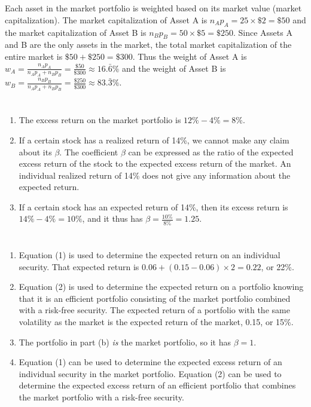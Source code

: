 \documentclass[12pt]{article}
\begin{document}
\section{}
Each asset in the market portfolio is weighted based on its market value (market capitalization). The market capitalization of Asset A is $n_Ap_A=25\times\$2=\$50$ and the market capitalization of Asset B is $n_Bp_B=50\times\$5=\$250$. Since Assets A and B are the only assets in the market, the total market capitalization of the entire market is $\$50+\$250=\$300$. Thus the weight of Asset A is $w_A=\frac{n_Ap_A}{n_Ap_A+n_Bp_B}=\frac{\$50}{\$300}\approx 16.\bar{6}\%$ and the weight of Asset B is $w_B=\frac{n_Bp_B}{n_Ap_A+n_Bp_B}=\frac{\$250}{\$300}\approx 83.\bar{3}\%$.
\section{}
\begin{enumerate}
    \item The excess return on the market portfolio is $12\%-4\%=8\%$. 
    \item If a certain stock has a realized return of 14\%, we cannot make any claim about its $\beta$. The coefficient $\beta$ can be expressed as the ratio of the expected excess return of the stock to the expected excess return of the market. An individual realized return of 14\% does not give any information about the expected return. 
    \item If a certain stock has an expected return of 14\%, then its excess return is $14\%-4\%=10\%$, and it thus has $\beta=\frac{10\%}{8\%}=1.25$.
\end{enumerate}
\section{}
\begin{enumerate}
    \item Equation (1) is used to determine the expected return on an individual security. That expected return is $0.06+(0.15-0.06)\times 2=0.22$, or 22\%.
    \item Equation (2) is used to determine the expected return on a portfolio knowing that it is an efficient portfolio consisting of the market portfolio combined with a risk-free security. The expected return of a portfolio with the same volatility as the market is the expected return of the market, 0.15, or 15\%.
    \item The portfolio in part (b) \textit{is} the market portfolio, so it has $\beta=1$.
    \item Equation (1) can be used to determine the expected excess return of an individual security in the market portfolio. Equation (2) can be used to determine the expected excess return of an efficient portfolio that combines the market portfolio with a risk-free security.
\end{enumerate}
\end{document}

